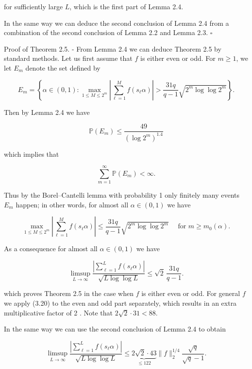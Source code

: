 \documentclass[10pt]{article}
\newcommand{\1}{\mathbf{1}}
\begin{document}
for sufficiently large $L$, which is the first part of Lemma 2.4.

In the same way we can deduce the second conclusion of Lemma 2.4 from a combination of the second conclusion of Lemma 2.2 and Lemma 2.3. \(\square\)

Proof of Theorem 2.5. - From Lemma 2.4 we can deduce Theorem 2.5 by standard methods. Let us first assume that $f$ is either even or odd. For $m \geqslant 1$, we let $E_{m}$ denote the set defined by

$$
E_{m}=\left\{\alpha \in(0,1): \max _{1 \leqslant M \leqslant 2^{m}}\left|\sum_{\ell=1}^{M} f\left(s_{\ell} \alpha\right)\right|>\frac{31q}{q-1}\sqrt{2^m\log\log 2^m}\right\} .
$$

Then by Lemma 2.4 we have


\begin{equation*}
\mathbb{P}\left(E_{m}\right) \leqslant \frac{49}{\left(\log 2^{m}\right)^{1.4}} \tag{3.19}
\end{equation*}


which implies that

$$
\sum_{m=1}^{\infty} \mathbb{P}\left(E_{m}\right)<\infty .
$$

Thus by the Borel--Cantelli lemma with probability 1 only finitely many events $E_{m}$ happen; in other words, for almost all $\alpha \in(0,1)$ we have

$$
\max _{1 \leqslant M \leqslant 2^{m}}\left|\sum_{\ell=1}^{M} f\left(s_{\ell} \alpha\right)\right| \leqslant\frac{31q}{q-1}\sqrt{2^m\log\log 2^m} \quad \text{ for } m \geqslant m_{0}(\alpha) .
$$

As a consequence for almost all $\alpha \in(0,1)$ we have


\begin{equation*}
\limsup _{L \rightarrow \infty} \frac{\left|\sum_{\ell=1}^{L} f\left(s_{\ell} \alpha\right)\right|}{\sqrt{L \log \log L}} \leqslant\sqrt2\,\frac{31q}{q-1}. \tag{3.20}
\end{equation*}


which proves Theorem 2.5 in the case when $f$ is either even or odd. For general $f$ we apply (3.20) to the even and odd part separately, which results in an extra multiplicative factor of 2 . Note that $2\sqrt2\cdot31<88$.

In the same way we can use the second conclusion of Lemma 2.4 to obtain


\begin{equation*}
\limsup _{L \rightarrow \infty} \frac{\left|\sum_{\ell=1}^{L} f\left(s_{\ell} \alpha\right)\right|}{\sqrt{L \log \log L}} \leqslant \underbrace{2 \sqrt{2} \cdot 43}_{\leqslant 122}\|f\|_{2}^{1 / 4}\frac{\sqrt q}{\sqrt q-1}. \tag{3.21}
\end{equation*}
\end{document}
